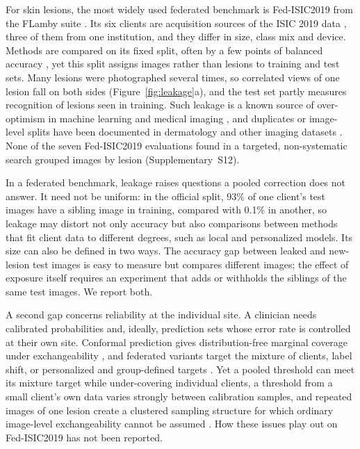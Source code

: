 \documentclass[VANCOUVER,Times1COL]{WileyNJDv5}
\begin{document}
For skin lesions, the most widely used federated benchmark is Fed-ISIC2019 from the FLamby suite
\cite{flamby2022}. Its six clients are acquisition sources of the ISIC 2019 data
\cite{codella2018isic,tschandl2018ham,combalia2019bcn}, three of them from one institution, and they differ
in size, class mix and device. Methods are compared on its fixed split, often by a few points of balanced
accuracy \cite{flamby2022,tavakoli2024fendafl}, yet this split assigns images rather than lesions to
training and test sets. Many lesions were photographed several times, so correlated views of one lesion
fall on both sides (Figure~\ref{fig:leakage}a), and the test set partly measures recognition of lesions
seen in training. Such leakage is a known source of over-optimism in machine learning and medical imaging
\cite{kapoor2023leakage,varoquaux2022failures,roberts2021pitfalls}, and duplicates or image-level splits
have been documented in dermatology and other imaging datasets
\cite{cassidy2022isic,groger2023reliable,abhishek2025dermamnist,bussola2021tiles,yagis2021leakage}. None of the seven Fed-ISIC2019 evaluations found in a targeted, non-systematic search grouped images by lesion (Supplementary~S12).

In a federated benchmark, leakage raises questions a pooled correction does not answer. It need not be
uniform: in the official split, 93\% of one client's test images have a sibling image in training,
compared with 0.1\% in another, so leakage may distort not only accuracy but also comparisons between
methods that fit client data to different degrees, such as local and personalized models. Its size can
also be defined in two ways. The accuracy gap between leaked and new-lesion test images is easy to measure
but compares different images; the effect of exposure itself requires an experiment that adds or
withholds the siblings of the same test images. We report both.

A second gap concerns reliability at the individual site. A clinician needs calibrated probabilities
\cite{guo2017calibration} and, ideally, prediction sets whose error rate is controlled at their own site.
Conformal prediction gives distribution-free marginal coverage under exchangeability
\cite{vovk2005algorithmic,angelopoulos2023gentle}, and federated variants target the mixture of clients,
label shift, or personalized and group-defined targets
\cite{lu2023fcp,humbert2023oneshot,plassier2023labelshift,min2025pfcp,wen2026gcfcp}. Yet a pooled
threshold can meet its mixture target while under-covering individual clients, a threshold from a small
client's own data varies strongly between calibration samples, and repeated images of one lesion create a clustered sampling structure for which ordinary image-level exchangeability cannot be assumed
\cite{lee2023hierarchical,dunn2022hierarchical}. How these issues play out on Fed-ISIC2019 has not been reported.
\end{document}
